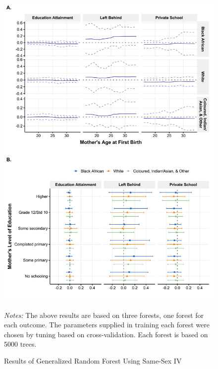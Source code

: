 \documentclass[11pt,a4paper]{article}
\newcommand\fnote[1]{\captionsetup{font=footnotesize}\caption*{#1}}
\begin{document}
\begin{figure}[h!]
\centering
\caption{\label{fig:07}Results of Generalized Random Forest Using Same-Sex IV}
\includegraphics[width=\textwidth]{figures/heter2.pdf}
\fnote{\textit{Notes:} The above results are based on three forests, one forest for each outcome. The parameters supplied in training each forest were chosen by tuning based on cross-validation. Each forest is based on 5000 trees. }
\end{figure}








\newpage
\end{document}
